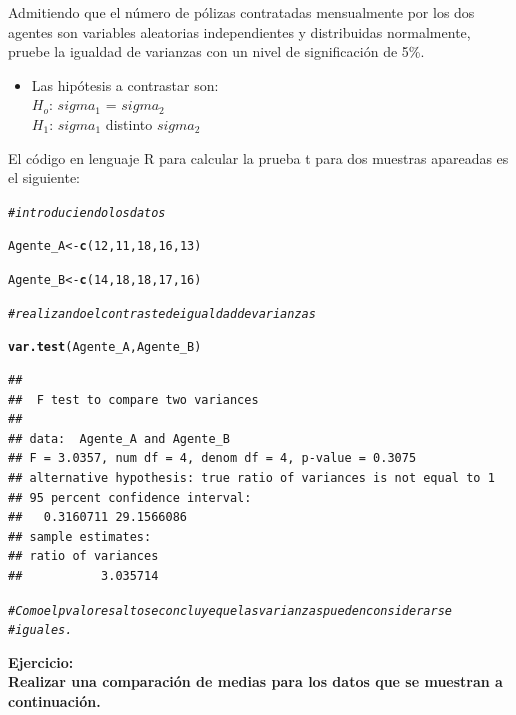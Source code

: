 \documentclass[12pt,letterpaper]{article}\usepackage[]{graphicx}\usepackage[]{color}
\makeatletter
\newcommand{\hlnum}[1]{\textcolor[rgb]{0.686,0.059,0.569}{#1}}%
\newcommand{\hlcom}[1]{\textcolor[rgb]{0.678,0.584,0.686}{\textit{#1}}}%
\newcommand{\hlstd}[1]{\textcolor[rgb]{0.345,0.345,0.345}{#1}}%
\newcommand{\hlkwb}[1]{\textcolor[rgb]{0.69,0.353,0.396}{#1}}%
\newcommand{\hlkwd}[1]{\textcolor[rgb]{0.737,0.353,0.396}{\textbf{#1}}}%
\newenvironment{kframe}{%
 \def\at@end@of@kframe{}%
 \ifinner\ifhmode%
  \def\at@end@of@kframe{\end{minipage}}%
  \begin{minipage}{\columnwidth}%
 \fi\fi%
 \def\FrameCommand##1{\hskip\@totalleftmargin \hskip-\fboxsep
 \colorbox{shadecolor}{##1}\hskip-\fboxsep
     \hskip-\linewidth \hskip-\@totalleftmargin \hskip\columnwidth}%
 \MakeFramed {\advance\hsize-\width
   \@totalleftmargin\z@ \linewidth\hsize
   \@setminipage}}%
 {\par\unskip\endMakeFramed%
 \at@end@of@kframe}
\newenvironment{knitrout}{}{} %
\makeatother
\begin{document}
Admitiendo que el n\'umero de p\'olizas contratadas mensualmente por los dos agentes son variables aleatorias independientes y distribuidas normalmente, pruebe la igualdad de varianzas con un nivel de significaci\'on de 5\%.\\

\begin{itemize}
  \item Las hip\'otesis a contrastar son:\\
  $H_o$: $sigma_1$ = $sigma_2$\\
  $H_1$: $sigma_1$ distinto $sigma_2$
\end{itemize}

El c\'odigo en lenguaje R para calcular la prueba t para dos muestras apareadas es el siguiente:
\begin{knitrout}
\color{fgcolor}\begin{kframe}
\begin{alltt}
\hlcom{#introduciendo los datos }

\hlstd{Agente_A} \hlkwb{<-} \hlkwd{c}\hlstd{(}\hlnum{12}\hlstd{,} \hlnum{11}\hlstd{,} \hlnum{18}\hlstd{,} \hlnum{16}\hlstd{,} \hlnum{13}\hlstd{)}

\hlstd{Agente_B} \hlkwb{<-} \hlkwd{c}\hlstd{(}\hlnum{14}\hlstd{,} \hlnum{18}\hlstd{,} \hlnum{18}\hlstd{,} \hlnum{17}\hlstd{,} \hlnum{16}\hlstd{)}

\hlcom{# realizando el contraste de igualdad de varianzas}

\hlkwd{var.test}\hlstd{(Agente_A, Agente_B)}
\end{alltt}
\begin{verbatim}
## 
## 	F test to compare two variances
## 
## data:  Agente_A and Agente_B
## F = 3.0357, num df = 4, denom df = 4, p-value = 0.3075
## alternative hypothesis: true ratio of variances is not equal to 1
## 95 percent confidence interval:
##   0.3160711 29.1566086
## sample estimates:
## ratio of variances 
##           3.035714
\end{verbatim}
\begin{alltt}
\hlcom{# Como el p valor es alto se concluye que las varianzas pueden considerarse }
\hlcom{# iguales. }
\end{alltt}
\end{kframe}
\end{knitrout}

\textbf{Ejercicio:}\\
 \textbf{Realizar una comparaci\'on de medias para los datos que se muestran a continuaci\'on.}\\
 
\end{document}
